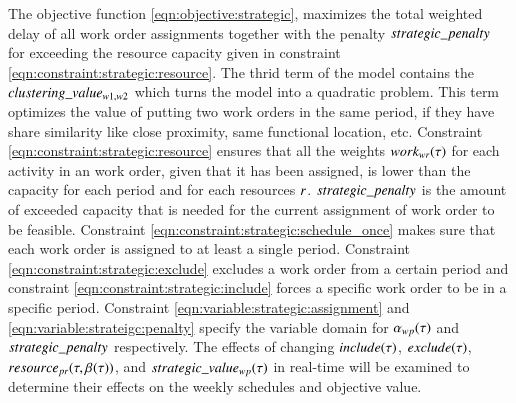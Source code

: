 The objective function \eqref{eqn:objective:strategic},  maximizes the total
weighted delay of all work order assignments together with the penalty $
strategic\_penalty$ for exceeding the resource capacity given in constraint
\eqref{eqn:constraint:strategic:resource}. The thrid term   of the model
contains the $clustering\_value_{w1, w2}$ which turns the model into a  quadratic
problem. This term optimizes the value of putting two work orders in the same
period, if they have share similarity like close proximity,  same functional
location, etc.  Constraint \eqref{eqn:constraint:strategic:resource} ensures
that all the weights $work_{wr}(\tau)$ for each activity in an work
order, given that it has been assigned, is lower than the capacity for each
period and for each resources $r$. $strategic\_penalty$ is the
amount of exceeded capacity that is needed for the current assignment of work
order to be feasible. Constraint \eqref{eqn:constraint:strategic:schedule_once}
makes sure that each work order is assigned to at least a single
period. Constraint \eqref{eqn:constraint:strategic:exclude}
excludes a work order from a certain period and constraint
\eqref{eqn:constraint:strategic:include} forces a specific work order to be
in a specific period. Constraint \eqref{eqn:variable:strategic:assignment}
and \eqref{eqn:variable:strateigc:penalty} specify the variable domain
for $\alpha_{wp}(\tau)$
and $strategic\_penalty$ respectively. The effects of changing $
include(\tau)$, $exclude(\tau)$, $resource_{pr}(\tau, \beta_{}(\tau))$, and $
strategic\_value_{w p}(\tau)$ in real-time will be examined to determine their effects on
the weekly schedules and objective value.
